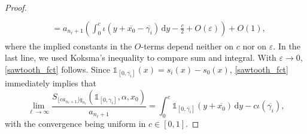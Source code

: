 \documentclass[10pt,a4paper]{amsart}
\numberwithin{equation}{section}
\newcommand{\rmd}{\mathrm{d}}
\newcommand{\kj}{n_{\ell}}
\theoremstyle{definition}
\begin{document}
\begin{proof}
\begin{multline*}
\begin{aligned}
\\
&= a_{\kj+1}\left(\int_{0}^{c} \iota\left(y + \overline{x_0}- \overline{\gamma_i}\right) \,\rmd y - \frac{c}{2} + O(\varepsilon) \right) + O(1),
\end{aligned}
\end{multline*}
where the implied constants in the $O$-terms depend neither on $c$ nor on $\varepsilon$. In the last line, we used Koksma's inequality to compare sum and integral. With $\varepsilon \to 0$, \eqref{sawtooth_fct} follows. Since $\mathds{1}_{[0,\overline{\gamma_i}]}(x) = s_i(x)-s_0(x)$, \eqref{sawtooth_fct} immediately implies that
\begin{equation*}
\lim_{\ell \to \infty} \frac{S_{ \lfloor c a_{\kj+1}\rfloor q_{\kj}}(\mathds{1}_{[0,\gamma_i]},\alpha,x_0)}{a_{\kj+1}} = \int_{0}^{c} \mathds{1}_{\left[0, \overline{\gamma_i}\right]}\left(y + \overline{x_0}\right) \,\rmd y - c\iota(\overline{\gamma_i}),
\end{equation*}
with the convergence being uniform in $c \in [0,1]$.
\end{proof}
\end{document}
